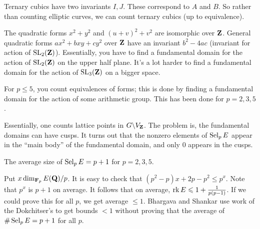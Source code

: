 Ternary cubics have two invariants $I,J$. These correspond to $A$ and $B$. So 
rather than counting elliptic curves, we can count ternary cubics (up to 
equivalence). 

The quadratic forms $x^2+y^2$ and $(u+v)^2+v^2$ are isomorphic over $\mathbf{Z}$. 
General quadratic forms $a x^2+b x y+c y^2$ over $\mathbf{Z}$ have an invariant 
$b^2-4 a c$ (invariant for action of $\operatorname{SL}_2(\mathbf{Z})$). Essentially, you have 
to find a fundamental domain for the action of $\operatorname{SL}_2(\mathbf{Z})$ on the upper 
half plane. It's a lot harder to find a fundamental domain for the action 
of $\operatorname{SL}_3(\mathbf{Z})$ on a bigger space. 

For $p\leqslant 5$, you count equivalences of forms; this is done by 
finding a fundamental domain for the action of some arithmetic group. 
This has been done for $p=2,3,5$. 

Essentially, one counts lattice points in $G\backslash V_{\mathbf{Z}}$. The problem 
is, the fundamental domains can have cusps. It turns out that the 
nonzero elements of $\operatorname{Sel}_p E$ appear in the ``main body'' of the 
fundamental domain, and only $0$ appears in the cusps. 

\begin{theorem}
The average size of $\operatorname{Sel}_p E=p+1$ for $p=2,3,5$. 
\end{theorem}

Put $x\dim_{\mathbf{F}_p} E(\mathbf{Q})/p$. It is easy to check that 
$(p^2-p) x+2 p-p^2 \leqslant p^x$. Note that $p^x$ is $p+1$ on average. 
It follows that on average, $\operatorname{rk} E\leqslant 1+\frac{1}{p(p-1)}$. 
If we could prove this for all $p$, we get average $\leqslant 1$. Bhargava 
and Shankar use work of the Dokchitser's to get bounds $<1$ without proving 
that the average of $\#\operatorname{Sel}_p E=p+1$ for all $p$. 
